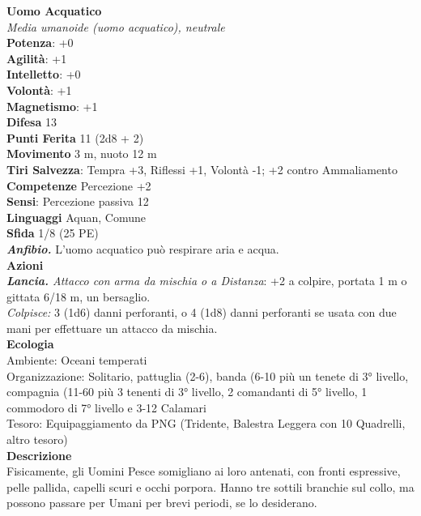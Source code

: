 \begin{multicols}{2}
\medskip\textbf{Uomo Acquatico}\\
\emph{Media umanoide (uomo acquatico), neutrale}\\
\textbf{Potenza}: +0\\
\textbf{Agilità}: +1\\
\textbf{Intelletto}: +0\\
\textbf{Volontà}: +1\\
\textbf{Magnetismo}: +1\\
\textbf{Difesa} 13\\
\textbf{Punti Ferita} 11 (2d8 + 2)\\
\textbf{Movimento} 3 m, nuoto 12 m\\
\textbf{Tiri Salvezza}:  Tempra +3, Riflessi +1, Volontà -1; +2 contro Ammaliamento\\
\textbf{Competenze} Percezione +2\\
\textbf{Sensi}: Percezione passiva 12\\
\textbf{Linguaggi} Aquan, Comune\\
\textbf{Sfida} 1/8 (25 PE)\smallskip\\
\emph{\textbf{Anfibio.}} L'uomo acquatico può respirare aria e acqua.\\
\smallskip\textbf{Azioni}\\
\emph{\textbf{Lancia.} Attacco con arma da mischia o a Distanza}: +2 a colpire, portata 1 m o gittata 6/18 m, un bersaglio.\\
\emph{Colpisce:} 3 (1d6) danni perforanti, o 4 (1d8) danni perforanti se usata con due mani per effettuare un attacco da mischia.\\
\textbf{Ecologia}\\
Ambiente: Oceani temperati\\
Organizzazione: Solitario, pattuglia (2-6), banda (6-10 più un tenete di 3° livello, compagnia (11-60 più 3 tenenti di 3° livello, 2 comandanti di 5° livello, 1 commodoro di 7° livello e 3-12 Calamari\\
Tesoro: Equipaggiamento da PNG (Tridente, Balestra Leggera con 10 Quadrelli, altro tesoro)\\
\textbf{Descrizione}\\
Fisicamente, gli Uomini Pesce somigliano ai loro antenati, con fronti espressive, pelle pallida, capelli scuri e occhi porpora. Hanno tre sottili branchie sul collo, ma possono passare per Umani per brevi periodi, se lo desiderano.\\


\end{multicols}
